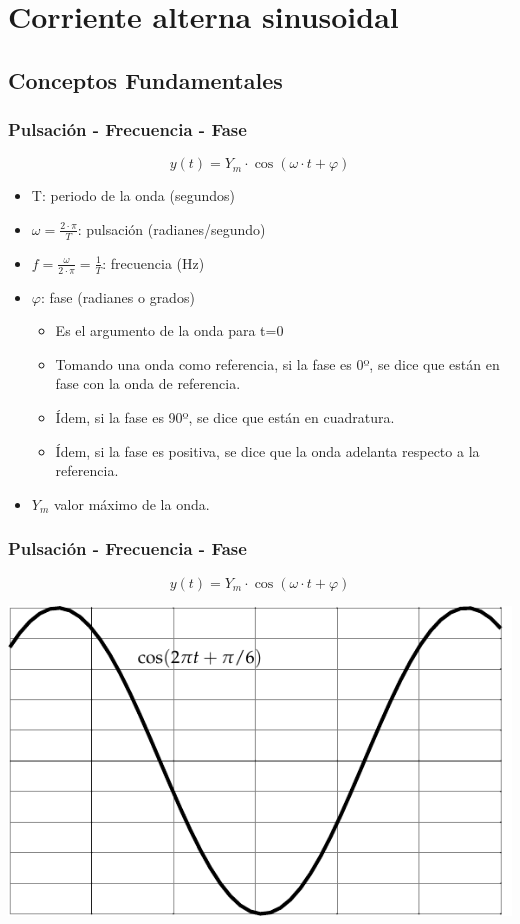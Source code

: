 \documentclass[serif, xcolor=dvipsnames]{beamer}
\begin{document}
\section{Corriente alterna sinusoidal}


\subsection{Conceptos Fundamentales}

\begin{frame}
  \frametitle{Pulsación - Frecuencia - Fase}

\[
y(t)=Y_{m}\cdot\cos(\omega\cdot t+\varphi)
\]

\begin{itemize}
\item T: periodo de la onda (segundos)
\item $\omega=\frac{2\cdot\pi}{T}$: pulsación (radianes/segundo)
\item $f=\frac{\omega}{2\cdot\pi}=\frac{1}{T}$: frecuencia (Hz)
\item $\varphi$: fase (radianes o grados)

  \begin{itemize}
  \item Es el argumento de la onda para t=0
  \item Tomando una onda como referencia, si la fase es 0º, se dice
    que están en fase con la onda de referencia.
  \item Ídem, si la fase es 90º, se dice que están en cuadratura.
  \item Ídem, si la fase es positiva, se dice que la onda adelanta
    respecto a la referencia.
  \end{itemize}
\item $Y_{m}$ valor máximo de la onda.
\end{itemize}

\end{frame}
\begin{frame}[plain]
  \frametitle{Pulsación - Frecuencia - Fase}

\[
y(t)=Y_{m}\cdot\cos(\omega\cdot t+\varphi)
\]


\begin{center}
  \includegraphics{../figs/Sin}
  \par\end{center}


\end{frame}
\end{document}
